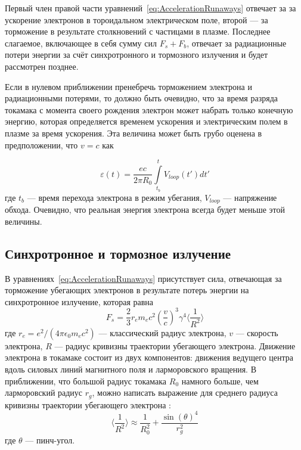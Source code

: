 Первый член правой части уравнений~\ref{eq:AccelerationRunaways} отвечает за за ускорение электронов в тороидальном электрическом поле, второй --- за торможение в результате столкновений с частицами в плазме. Последнее слагаемое, включающее в себя сумму сил $F_s + F_b$, отвечает за радиационные потери энергии за счёт синхротронного и тормозного излучения и будет рассмотрен позднее.

Если в нулевом приближении пренебречь торможением электрона и радиационными потерями, то должно быть очевидно, что за время разряда токамака с момента своего рождения электрон может набрать только конечную энергию, которая определяется временем ускорения и электрическим полем в плазме за время ускорения. Эта величина может быть грубо оценена в предположении, что $v = c$ как

\begin{equation}
  \label{eq:MaxRunawayEnergyLimit}
  \varepsilon(t) = \frac{ e c }{ 2 \pi R_0 } \int \limits_{t_b}^{t} V_{loop}(t') d t'
\end{equation}
где $t_b$ --- время перехода электрона в режим убегания, $V_{loop}$ --- напряжение обхода. Очевидно, что реальная энергия электрона всегда будет меньше этой величины.~\cite{Shevelev2019th}


\subsection{Синхротронное и тормозное излучение}

В уравнениях~\ref{eq:AccelerationRunaways} присутствует сила, отвечающая за торможение убегающих электронов в результате потерь энергии на синхротронное излучение, которая равна \cite{MartinSolis1998, MartinSolis1999} 
\begin{equation*}
  F_s = \frac{2}{3} r_e m_e c^2 \left( \frac{v}{c} \right)^3 \gamma^4 \langle \frac{1}{R^2} \rangle
\end{equation*}
где $r_e = e^2/(4 \pi \epsilon_0 m_e c^2 )$ --- классический радиус электрона, $v$ --- скорость электрона, $R$ --- радиус кривизны траектории убегающего электрона. Движение электрона в токамаке 
состоит из двух компонентов: движения ведущего центра вдоль силовых линий магнитного поля и ларморовского вращения. В приближении, что большой радиус токамака $R_0$ намного больше, чем ларморовский радиус $r_g$, можно написать выражение для среднего радиуса кривизны траектории убегающего электрона \cite{MartinSolis1998}:
\begin{equation*}
  \langle \frac{1}{R^2} \rangle \approx \frac{1}{R_0^2} + \frac{ \sin(\theta)^4 }{r_g^2}
\end{equation*}
где $\theta$ --- пинч-угол. 

